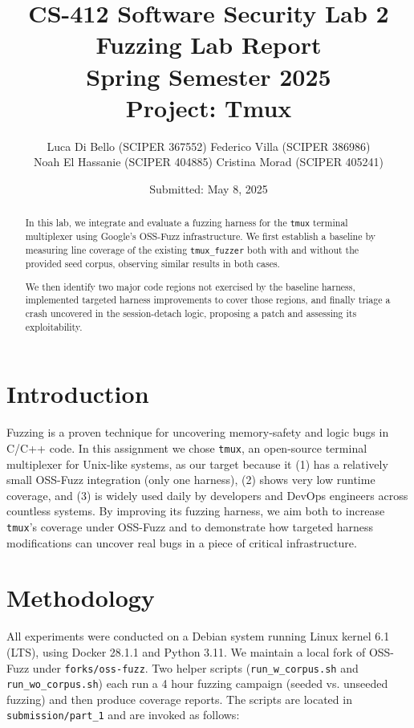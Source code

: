 \documentclass[11pt,a4paper,twocolumn]{article}
\title{%
  CS-412 Software Security Lab 2\\[0.5em]
  \Large Fuzzing Lab Report\\
  Spring Semester 2025\\[0.5em]
  Project: Tmux
}
\author{%
  Luca Di Bello (SCIPER 367552)
  Federico Villa (SCIPER 386986) \\
  Noah El Hassanie (SCIPER 404885)
  Cristina Morad (SCIPER 405241) \\
}
\date{Submitted: May 8, 2025}
\begin{document}
\maketitle

\begin{abstract}
	In this lab, we integrate and evaluate a fuzzing harness for the \texttt{tmux} terminal
	multiplexer using Google’s OSS-Fuzz infrastructure. We first establish a baseline
	by measuring line coverage of the existing \texttt{tmux\_fuzzer} both with and without the
	provided seed corpus, observing similar results in both cases.

	We then identify two major code regions not exercised by the baseline harness, implemented
	targeted harness improvements to cover those regions, and finally triage a crash uncovered
	in the session-detach logic, proposing a patch and assessing its exploitability.
\end{abstract}

\section{Introduction}

Fuzzing is a proven technique for uncovering memory‐safety and logic bugs in C/C++ code. In this assignment we chose \texttt{tmux}, an open-source terminal multiplexer for Unix-like systems, as our target because it (1) has a relatively small OSS-Fuzz integration (only one harness), (2) shows very low runtime coverage, and (3) is widely used daily by developers and DevOps engineers across countless systems.  By improving its fuzzing harness, we aim both to increase \texttt{tmux}’s coverage under OSS-Fuzz and to demonstrate how targeted harness modifications can uncover real bugs in a piece of critical infrastructure.

\section{Methodology}
\label{sec:methodology}

All experiments were conducted on a Debian system running Linux kernel 6.1 (LTS), using Docker 28.1.1 and Python 3.11. We maintain a local fork of OSS-Fuzz under \texttt{forks/oss-fuzz}. Two helper scripts (\texttt{run\_w\_corpus.sh} and \texttt{run\_wo\_corpus.sh}) each run a 4 hour fuzzing campaign (seeded vs. unseeded fuzzing) and then produce coverage reports. The scripts are located in \texttt{submission/part\_1} and are invoked as follows:
\end{document}
